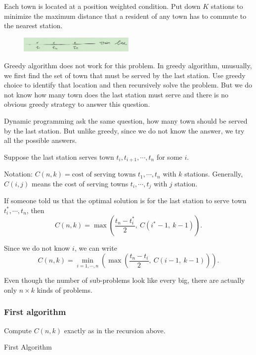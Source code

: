 Each town is located at a position weighted condition. Put down $K$ stations to minimize the maximum distance that a resident of any town has to commute to the nearest station.

\begin{figure}[H]
	\centering
	\includegraphics[width=0.5\textwidth]{fig/train-line.png}
\end{figure}

Greedy algorithm does not work for this problem. In greedy algorithm, unusually, we first find the set of town that must be served by the last station. Use greedy choice to identify that location and then recursively solve the problem. But we do not know how many town does the last station must serve and there is no obvious greedy strategy to answer this question.
 
Dynamic programming ask the same question, how many town should be served by the last station. But unlike greedy, since we do not know the answer, we try all the possible answers. 

Suppose the last station serves town $t_i, t_{i+1}, \cdots, t_n$ for some $i$. 

Notation: $C(n, k) = \text{cost of serving towns } t_1, \cdots, t_n$ with $k$ stations. Generally, $C(i, j)$ means the cost of serving towns $t_i, \cdots, t_j$ with $j$ station.

If someone told us that the optimal solution is for the last station to serve town $t_i^*, \cdots, t_n$, then 
\[C(n,k) = \max(\frac{t_n - t_i^*}{2}, ~C(i^* - 1, ~k - 1)).\]

Since we do not know $i$, we can write
\[C(n, k) = \min_{i = 1, \cdots, n}(\max(\frac{t_n - t_i}{2}, ~C(i -1, ~k - 1))).\]

Even though the number of sub-problems look like every big, there are actually only $n \times k$ kinds of problems.

\subsubsection{First algorithm}

Compute $C(n, k)$ exactly as in the recursion above.

\begin{algorithm}[H] 
	\caption{First Algorithm}
	\label{alg:loop}
	\begin{algorithmic}[1]
	 \textbf{\textbf{}}
	\Statex

		\Else
			\EndIf
			\EndFor
			\State {}
		\EndIf
	\EndFunction
	\end{algorithmic}
\end{algorithm}

